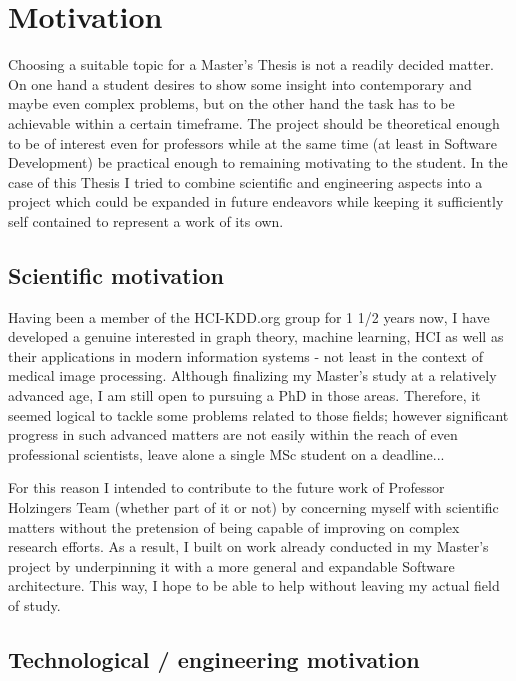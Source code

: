 \chapter{Motivation}
\label{ch:motivation}

Choosing a suitable topic for a Master's Thesis is not a readily decided matter. On one hand a student desires to show some insight into contemporary and maybe even complex problems, but on the other hand the task has to be achievable within a certain timeframe. The project should be theoretical enough to be of interest even for professors while at the same time (at least in Software Development) be practical enough to remaining motivating to the student. In the case of this Thesis I tried to combine scientific and engineering aspects into a project which could be expanded in future endeavors while keeping it sufficiently self contained to represent a work of its own.


\section{Scientific motivation}
\label{sect:scientific_motivation}

Having been a member of the HCI-KDD.org group for 1 1/2 years now, I have developed a genuine interested in graph theory, machine learning, HCI as well as their applications in modern information systems - not least in the context of medical image processing. Although finalizing my Master's study at a relatively advanced age, I am still open to pursuing a PhD in those areas. Therefore, it seemed logical to tackle some problems related to those fields; however significant progress in such advanced matters are not easily within the reach of even professional scientists, leave alone a single MSc student on a deadline...

For this reason I intended to contribute to the future work of Professor Holzingers Team (whether part of it or not) by concerning myself with scientific matters without the pretension of being capable of improving on complex research efforts. As a result, I built on work already conducted in my Master's project by underpinning it with a more general and expandable Software architecture. This way, I hope to be able to help without leaving my actual field of study.


\section{Technological / engineering motivation}
\label{sect:technological_motivation}

